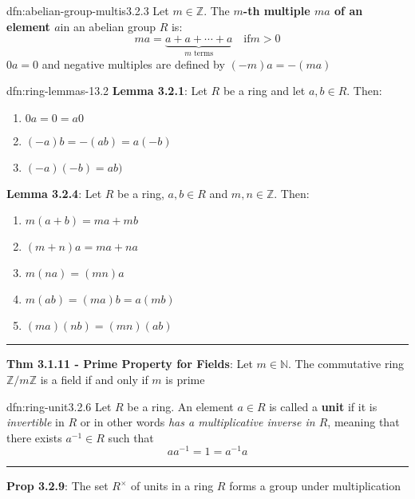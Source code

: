 \documentclass[landscape, 8pt]{extarticle}
\begin{document}
\begin{multicols}{3}
\begin{dfn}{dfn:abelian-group-multis}{3.2.3}
    Let $m\in \mathbb{Z}$. The \textbf{$m$-th multiple $ma$ of an element $a$}in an abelian group $R$ is:
    \[ma = \underbrace{a + a + \cdots + a}_{\text{$m$ terms}} \quad \text{if} m > 0\]
    $0a = 0$ and negative multiples are defined by $(-m)a = -(ma)$
\end{dfn}

\begin{thm}{dfn:ring-lemmas-1}{3.2}
    \textbf{Lemma 3.2.1}: Let $R$ be a ring and let $a,b\in R$. Then:
    \begin{enumerate}
        \setlength\itemsep{0em}
        \item $0a = 0 = a 0$
        \item $(-a)b = -(ab) = a(-b)$
        \item $(-a)(-b) = ab)$
    \end{enumerate}

    \textbf{Lemma 3.2.4}: Let $R$ be a ring, $a,b\in R$ and $m,n\in \mathbb{Z}$. Then:
    \begin{enumerate}
        \setlength\itemsep{0em}
        \item $m(a + b) = ma + mb$
        \item $(m + n)a = ma + na$
        \item $m(na) = (mn)a$
        \item $m(ab) = (ma)b = a(mb)$
        \item $(ma)(nb) = (mn)(ab)$
    \end{enumerate}

    \vspace{-5pt}
    \noindent\rule{\textwidth}{0.2pt}
    \textbf{Thm 3.1.11 - Prime Property for Fields}: Let $m\in\mathbb{N}$. The commutative ring $\mathbb{Z} / m\mathbb{Z}$ is a field if and only if $m$ is prime
\end{thm}

\begin{dfn}{dfn:ring-unit}{3.2.6}
    Let $R$ be a ring. An element $a\in R$ is called a \textbf{unit} if it is \textit{invertible} in $R$ or in other words \textit{has a multiplicative inverse in $R$}, meaning that there exists $a^{-1}\in R$ such that
    \[aa^{-1} = 1 = a^{-1} a\]

    \vspace{-5pt}
    \noindent\rule{\textwidth}{0.2pt}
    \textbf{Prop 3.2.9}: The set $R^{\times}$ of units in a ring $R$ forms a group under multiplication
\end{dfn}


\end{multicols}
\end{document}
